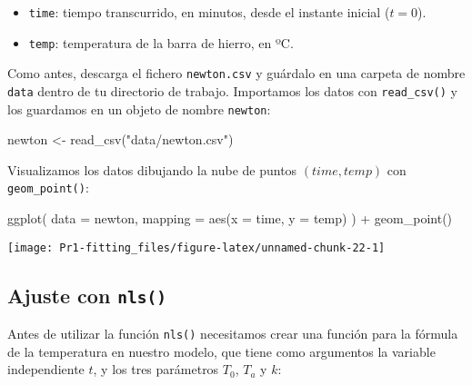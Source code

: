 \documentclass[
  degree=mecinf,
  title=normal,
  toc=normal,
  bib=normal]{mnye}
\newenvironment{Shaded}{\begin{snugshade}}{\end{snugshade}}
\newcommand{\AttributeTok}[1]{\textcolor[rgb]{0.77,0.63,0.00}{#1}}
\newcommand{\FunctionTok}[1]{\textcolor[rgb]{0.00,0.00,0.00}{#1}}
\newcommand{\NormalTok}[1]{#1}
\newcommand{\OtherTok}[1]{\textcolor[rgb]{0.56,0.35,0.01}{#1}}
\newcommand{\SpecialCharTok}[1]{\textcolor[rgb]{0.00,0.00,0.00}{#1}}
\newcommand{\StringTok}[1]{\textcolor[rgb]{0.31,0.60,0.02}{#1}}
\begin{document}
\begin{itemize}
\item
  \texttt{time}: tiempo transcurrido, en minutos, desde el instante inicial (\(t=0\)).
\item
  \texttt{temp}: temperatura de la barra de hierro, en ºC.
\end{itemize}

Como antes, descarga el fichero \texttt{newton.csv} y guárdalo en una carpeta de nombre \texttt{data} dentro de tu directorio de trabajo. Importamos los datos con \texttt{read\_csv()} y los guardamos en un objeto de nombre \texttt{newton}:

\begin{Shaded}
\begin{Highlighting}[]
\NormalTok{newton }\OtherTok{\textless{}{-}} \FunctionTok{read\_csv}\NormalTok{(}\StringTok{"data/newton.csv"}\NormalTok{)}
\end{Highlighting}
\end{Shaded}

Visualizamos los datos dibujando la nube de puntos \((time, temp)\) con \texttt{geom\_point()}:

\begin{Shaded}
\begin{Highlighting}[]
\FunctionTok{ggplot}\NormalTok{(}
    \AttributeTok{data =}\NormalTok{ newton,}
    \AttributeTok{mapping =} \FunctionTok{aes}\NormalTok{(}\AttributeTok{x =}\NormalTok{ time, }\AttributeTok{y =}\NormalTok{ temp)}
\NormalTok{) }\SpecialCharTok{+} 
    \FunctionTok{geom\_point}\NormalTok{()}
\end{Highlighting}
\end{Shaded}

\begin{center}\texttt{[image: Pr1-fitting\_files/figure-latex/unnamed-chunk-22-1]} \end{center}

\hypertarget{ajuste-con-nls}{%
\subsection{\texorpdfstring{Ajuste con \texttt{nls()}}{Ajuste con nls()}}\label{ajuste-con-nls}}

Antes de utilizar la función \texttt{nls()} necesitamos crear una función para la fórmula de la temperatura en nuestro modelo, que tiene como argumentos la variable independiente \(t\), y los tres parámetros \(T_0\), \(T_a\) y \(k\):
\end{document}
